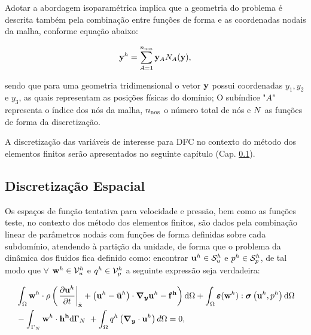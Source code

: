 \documentclass[tese_patricia]{subfiles}%
\begin{document}
Adotar a abordagem isoparamétrica implica que a geometria do problema é descrita também pela combinação entre funções de forma e as coordenadas nodais da malha, conforme equação abaixo:

\begin{align}
	\mathbf{y}^{h} = \sum_{A = 1}^{n_{\mathrm{nos}}} \mathbf{y}_{A}N_{A}(\mathbf{y}),
\end{align}

\noindent sendo que para uma geometria tridimensional o vetor $\mathbf{y}$ possui coordenadas $y_1,y_2$ e $y_3$, as quais representam as posições físicas do domínio; O subíndice "$A$" $ \ $ representa o índice dos nós da malha, $n_{\mathrm{nos}}$ o número total de nós e $N$ as funções de forma da discretização.

A discretização das variáveis de interesse para DFC no contexto do método dos elementos finitos serão apresentados no seguinte capítulo (Cap. \ref{capitulo:Cap2:DiscEspacial}).


\subsection{Discretização Espacial} \label{capitulo:Cap2:DiscEspacial}

Os espaços de função tentativa para velocidade e pressão, bem como as funções teste, no contexto dos método dos elementos finitos, são dados pela combinação linear de parâmetros nodais com funções de forma definidas sobre cada subdomínio, atendendo à partição da unidade, de forma que o problema da dinâmica dos fluidos fica definido como: encontrar $\mathbf{u}^h \in \mathcal{S}_u^h$ e $p^h \in \mathcal{S}_p^h$, de tal modo que $\forall$ $\mathbf{w}^h \in \mathcal{V}_u^h$ e $q^h \in \mathcal{V}_p^h$ a seguinte expressão seja verdadeira:

\begin{align}
	\begin{split}
		&\int_{\Omega} \mathbf{w}^h \cdot \rho \left(\left. \frac{\partial\mathbf{u}^h}{\partial t} \right|_{\bar{\mathbf{x}}} + \left(\mathbf{u}^h - \bar{\mathbf{u}}^h \right)\cdot\boldsymbol{\nabla_y} \mathbf{u}^h - \mathbf{f^h} \right) \mathrm{d} \Omega + \int_{\Omega} \bm{\varepsilon}(\mathbf{w}^h) : \boldsymbol{\sigma}\left(\mathbf{u}^h,p^h \right)  \mathrm{d} \Omega\\ & - \int_{\Gamma_{N}} \mathbf{w}^h \cdot \mathbf{h^h} \mathrm{d} \Gamma_{N} \ + \int_{\Omega} q^h \left(\boldsymbol{\nabla_y} \cdot \mathbf{u}^h\right) d \Omega = 0,  \label{eq:QM_C_forma_fraca_1} 
	\end{split}
\end{align}
\end{document}
